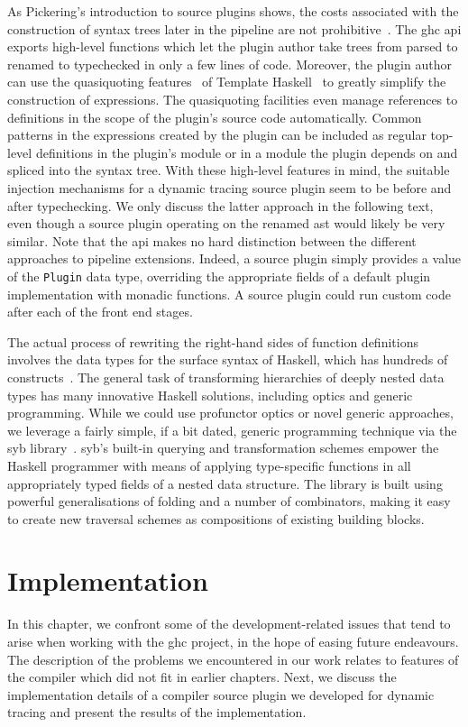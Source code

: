 \documentclass[thesis=B,english]{FITthesis}[2019/12/23]
\newcommand{\hsType}[1]{\texttt{#1}}
\begin{document}
As Pickering's introduction to source plugins shows, the costs associated with
the construction of syntax trees later in the pipeline are not
prohibitive~\cite{blog-source-plugins}. The \acrshort{ghc} \acrshort{api}
exports high-level functions which let the plugin author take trees from parsed
to renamed to typechecked in only a few lines of code.  Moreover, the plugin
author can use the quasi\-quoting features~\cite{th-quasiquoting} of Template
Haskell~\cite{th-classic} to greatly simplify the construction of expressions.
The quasi\-quoting facilities even manage references to definitions in the
scope of the plugin's source code automatically. Common patterns in the
expressions created by the plugin can be included as regular top-level
definitions in the plugin's module or in a module the plugin depends on and
spliced into the syntax tree. With these high-level features in mind, the
suitable injection mechanisms for a dynamic tracing source plugin seem to be
before and after typechecking. We only discuss the latter approach in the
following text, even though a source plugin operating on the renamed
\acrshort{ast} would likely be very similar. Note that the \acrshort{api} makes
no hard distinction between the different approaches to pipeline extensions.
Indeed, a source plugin simply provides a value of the \hsType{Plugin} data
type, overriding the appropriate fields of a default plugin implementation with
monadic functions. A source plugin could run custom code after each of the
front end stages.

The actual process of rewriting the right-hand sides of function definitions
involves the data types for the surface syntax of Haskell, which has hundreds
of constructs~\cite[Key~Design~Choices]{arch-ghc}. The general task of
transforming hierarchies of deeply nested data types has many innovative
Haskell solutions, including optics and generic programming. While we could use
pro\-functor optics or novel generic approaches, we leverage a fairly simple,
if a bit dated, generic programming technique via the \acrfull{syb}
library~\cite{syb-paper}. \acrshort{syb}'s built-in querying and transformation
schemes empower the Haskell programmer with means of applying type-specific
functions in all appropriately typed fields of a nested data structure. The
library is built using powerful generalisations of folding and a number of
combinators, making it easy to create new traversal schemes as compositions of
existing building blocks.


\chapter{Implementation}
In this chapter, we confront some of the development-related issues that tend
to arise when working with the \acrshort{ghc} project, in the hope of easing
future endeavours. The description of the problems we encountered in our work
relates to features of the compiler which did not fit in earlier chapters.
Next, we discuss the implementation details of a compiler source plugin we
developed for dynamic tracing and present the results of the implementation.
\end{document}
